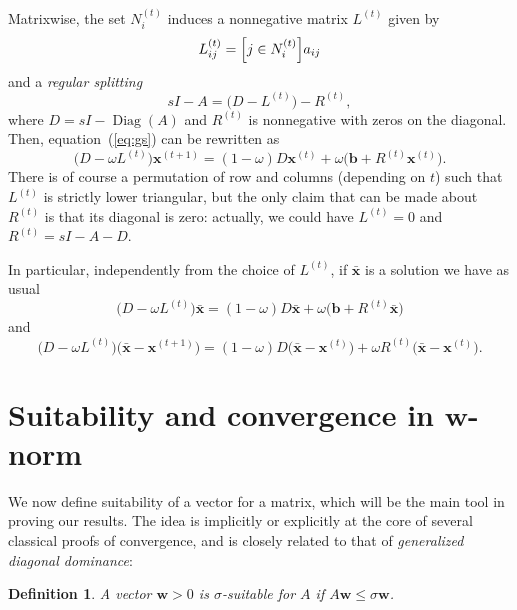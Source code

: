 \documentclass{article}
\newcommand{\Diag}[1]{\operatorname{Diag}(#1)}
\newcommand{\w}{{\bm w}}
\newcommand{\x}{{\bm x}}
\newcommand{\1}{\mathbf 1}
\newtheorem{definition}{Definition}
\begin{document}
Matrixwise, the set $N_i^{(t)}$ induces a nonnegative
matrix $L^{(t)}$ given by
\[
L^{(t)}_{ij} = \Bigl[j\in N^{(t)}_i\Bigr]a_{ij}
\]
and a \emph{regular splitting}
\[
s  I-  A= \bigl(D- L^{(t)} \bigr) - R^{(t)},
\]
where $D=sI- \Diag A$ and $R^{(t)}$ is nonnegative with zeros on the diagonal.
Then, equation~(\ref{eq:gs}) can be rewritten as
\[
\bigl(D- \omega L^{(t)}\bigr)\x^{(t+1)} = (1-\omega)D\x^{(t)} +
\omega\bigl( \bm b +R^{(t)}\x^{(t)} \bigr).
\]
There is of course a permutation of row and columns (depending on $t$) such that 
$L^{(t)}$ is strictly lower triangular, but the only claim that can be made
about $R^{(t)}$ is that its diagonal is zero: actually, we could have
$L^{(t)}=0$ and $R^{(t)}=s  I - A - D$.

In particular, independently from the choice of $L^{(t)}$, if $\bar\x$ is a
solution we have as usual
\[
\bigl(D- \omega L^{(t)}\bigr)\bar\x = (1-\omega)D\bar\x +
\omega\bigl(\bm b  + R^{(t)}\bar\x \bigr)
\]
and
\begin{equation}
\label{eq:err}
\bigl(D- \omega L^{(t)}\bigr)\bigl(\bar\x-\x^{(t+1)}\bigr) =
(1-\omega)D\bigl(\bar\x-\x^{(t)}\bigr) + \omega
R^{(t)}\bigl(\bar\x-\x^{(t)}\bigr).
\end{equation}

\section{Suitability and convergence in $\w$-norm}
We now define suitability of a vector for a matrix, which will be the main tool in
proving our results. The idea is implicitly or explicitly at the core of several
classical proofs of convergence, and is closely related to that of \emph{generalized diagonal dominance}:
\begin{definition}
A vector $\w>0$ is \emph{$\sigma$-suitable} for $A$ if
$A\w\leq\sigma\w$.
\end{definition}
\end{document}
